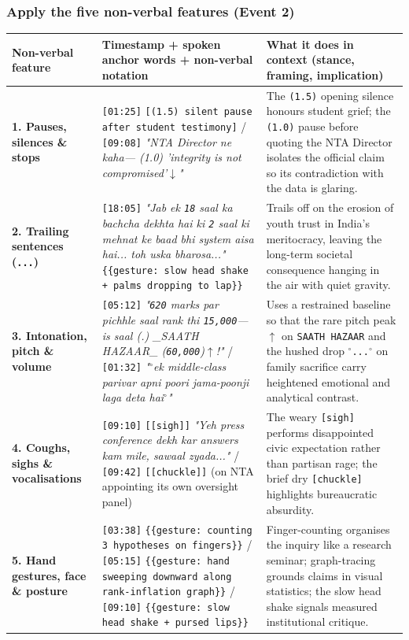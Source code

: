 \documentclass[10pt,a4paper]{article}
\begin{document}
\subsubsection*{Apply the five non-verbal features (Event 2)}

\begin{longtable}{|p{}|p{}|p{}|}
\hline
Non-verbal feature & Timestamp + spoken anchor words + non-verbal notation & What it does in context (stance, framing, implication) \\ \hline \endhead
\textbf{1. Pauses, silences \& stops} & \texttt{[01:25]} \texttt{[(1.5) silent pause after student testimony]} / \texttt{[09:08]} \textit{"NTA Director ne kaha--- (1.0) 'integrity is not compromised'$\downarrow$"} & The \texttt{(1.5)} opening silence honours student grief; the \texttt{(1.0)} pause before quoting the NTA Director isolates the official claim so its contradiction with the data is glaring. \\ \hline
\textbf{2. Trailing sentences (\texttt{...})} & \texttt{[18:05]} \textit{"Jab ek \texttt{18} saal ka bachcha dekhta hai ki \texttt{2} saal ki mehnat ke baad bhi system aisa hai... toh uska bharosa..."} \texttt{\{\{gesture: slow head shake + palms dropping to lap\}\}} & Trails off on the erosion of youth trust in India's meritocracy, leaving the long-term societal consequence hanging in the air with quiet gravity. \\ \hline
\textbf{3. Intonation, pitch \& volume} & \texttt{[05:12]} \textit{"\texttt{620} marks par pichhle saal rank thi \texttt{15,000}---is saal (.) \_SAATH HAZAAR\_ (\texttt{60,000})$\uparrow$!"} / \texttt{[01:32]} \textit{"$^\circ$ek middle-class parivar apni poori jama-poonji laga deta hai$^\circ$"} & Uses a restrained baseline so that the rare pitch peak \texttt{$\uparrow$} on \texttt{SAATH HAZAAR} and the hushed drop \texttt{$^\circ$...$^\circ$} on family sacrifice carry heightened emotional and analytical contrast. \\ \hline
\textbf{4. Coughs, sighs \& vocalisations} & \texttt{[09:10]} \texttt{[[sigh]]} \textit{"Yeh press conference dekh kar answers kam mile, sawaal zyada..."} / \texttt{[09:42]} \texttt{[[chuckle]]} (on NTA appointing its own oversight panel) & The weary \texttt{[sigh]} performs disappointed civic expectation rather than partisan rage; the brief dry \texttt{[chuckle]} highlights bureaucratic absurdity. \\ \hline
\textbf{5. Hand gestures, face \& posture} & \texttt{[03:38]} \texttt{\{\{gesture: counting 3 hypotheses on fingers\}\}} / \texttt{[05:15]} \texttt{\{\{gesture: hand sweeping downward along rank-inflation graph\}\}} / \texttt{[09:10]} \texttt{\{\{gesture: slow head shake + pursed lips\}\}} & Finger-counting organises the inquiry like a research seminar; graph-tracing grounds claims in visual statistics; the slow head shake signals measured institutional critique. \\ \hline
\end{longtable}
\end{document}
